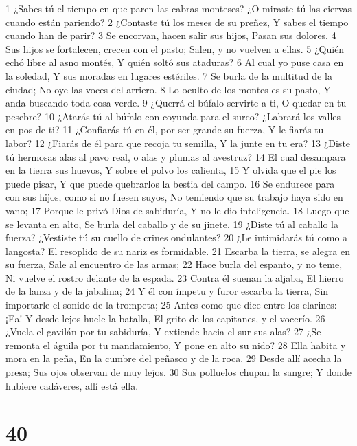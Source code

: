 1 ¿Sabes tú el tiempo en que paren las cabras monteses?  
¿O miraste tú las ciervas cuando están pariendo? 
2 ¿Contaste tú los meses de su preñez,  
Y sabes el tiempo cuando han de parir?  
3 Se encorvan, hacen salir sus hijos,  
Pasan sus dolores.  
4 Sus hijos se fortalecen, crecen con el pasto;  
Salen, y no vuelven a ellas. 
5 ¿Quién echó libre al asno montés,  
Y quién soltó sus ataduras?  
6 Al cual yo puse casa en la soledad,  
Y sus moradas en lugares estériles.  
7 Se burla de la multitud de la ciudad;  
No oye las voces del arriero.  
8 Lo oculto de los montes es su pasto,  
Y anda buscando toda cosa verde.  
9 ¿Querrá el búfalo servirte a ti,  
O quedar en tu pesebre?  
10 ¿Atarás tú al búfalo con coyunda para el surco?  
¿Labrará los valles en pos de ti?  
11 ¿Confiarás tú en él, por ser grande su fuerza,  
Y le fiarás tu labor? 
12 ¿Fiarás de él para que recoja tu semilla,  
Y la junte en tu era?  
13 ¿Diste tú hermosas alas al pavo real,  
o alas y plumas al avestruz?  
14 El cual desampara en la tierra sus huevos,  
Y sobre el polvo los calienta,  
15 Y olvida que el pie los puede pisar,  
Y que puede quebrarlos la bestia del campo.  
16 Se endurece para con sus hijos, como si no fuesen suyos,  
No temiendo que su trabajo haya sido en vano;  
17 Porque le privó Dios de sabiduría,  
Y no le dio inteligencia.  
18 Luego que se levanta en alto, 
Se burla del caballo y de su jinete.  
19 ¿Diste tú al caballo la fuerza?  
¿Vestiste tú su cuello de crines ondulantes? 
20 ¿Le intimidarás tú como a langosta?  
El resoplido de su nariz es formidable.  
21 Escarba la tierra, se alegra en su fuerza,  
Sale al encuentro de las armas;  
22 Hace burla del espanto, y no teme,  
Ni vuelve el rostro delante de la espada.  
23 Contra él suenan la aljaba,  
El hierro de la lanza y de la jabalina;  
24 Y él con ímpetu y furor escarba la tierra,  
Sin importarle el sonido de la trompeta;  
25 Antes como que dice entre los clarines: ¡Ea!  
Y desde lejos huele la batalla,  
El grito de los capitanes, y el vocerío.  
26 ¿Vuela el gavilán por tu sabiduría,  
Y extiende hacia el sur sus alas?  
27 ¿Se remonta el águila por tu mandamiento,  
Y pone en alto su nido?  
28 Ella habita y mora en la peña,  
En la cumbre del peñasco y de la roca.  
29 Desde allí acecha la presa;  
Sus ojos observan de muy lejos.  
30 Sus polluelos chupan la sangre;  
Y donde hubiere cadáveres, allí está ella.  

\chapter{40}

